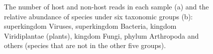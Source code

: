 \documentclass[11pt]{article}
\begin{document}
\begin{figure}[H]
        \caption{The number of host and non-host reads in each sample (a) and the relative abundance of species under six taxonomic groups (b): superkingdom Viruses, superkingdom Bacteria, kingdom Viridiplantae (plants), kingdom Fungi, phylum Arthropoda and others (species that are not in the other five groups).}
        \label{GroupAbundance}
        \end{figure}
    
\end{document}
